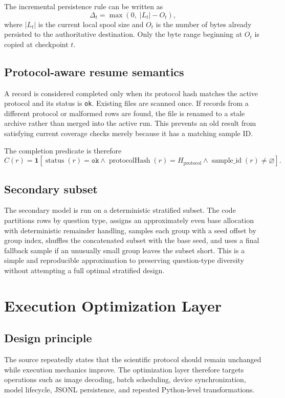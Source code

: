 \documentclass[11pt,a4paper]{article}
\newcommand{\code}[1]{\texttt{#1}}
\begin{document}
The incremental persistence rule can be written as
\begin{equation}
\Delta_t = \max\!\left(0,\; |L_t| - O_t\right),
\end{equation}
where \(|L_t|\) is the current local spool size and \(O_t\) is the number of bytes already persisted to the authoritative destination. Only the byte range beginning at \(O_t\) is copied at checkpoint \(t\).

\subsection{Protocol-aware resume semantics}
A record is considered completed only when its protocol hash matches the active protocol and its status is \code{ok}. Existing files are scanned once. If records from a different protocol or malformed rows are found, the file is renamed to a stale archive rather than merged into the active run. This prevents an old result from satisfying current coverage checks merely because it has a matching sample ID.

The completion predicate is therefore
\begin{equation}
C(r)=\mathbf{1}\!\left[
\operatorname{status}(r)=\texttt{ok}
\land
\operatorname{protocolHash}(r)=H_{\mathrm{protocol}}
\land
\operatorname{sample\_id}(r)\neq \varnothing
\right].
\end{equation}

\subsection{Secondary subset}
The secondary model is run on a deterministic stratified subset. The code partitions rows by question type, assigns an approximately even base allocation with deterministic remainder handling, samples each group with a seed offset by group index, shuffles the concatenated subset with the base seed, and uses a final fallback sample if an unusually small group leaves the subset short. This is a simple and reproducible approximation to preserving question-type diversity without attempting a full optimal stratified design.

\section{Execution Optimization Layer}
\subsection{Design principle}
The source repeatedly states that the scientific protocol should remain unchanged while execution mechanics improve. The optimization layer therefore targets operations such as image decoding, batch scheduling, device synchronization, model lifecycle, JSONL persistence, and repeated Python-level transformations.
\end{document}
